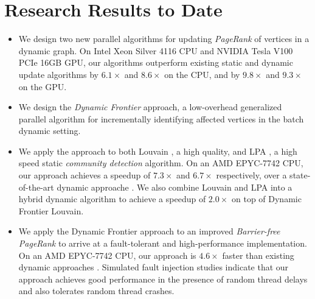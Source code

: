 



\vspace{-2ex}
\section{Research Results to Date}
\vspace{-1ex}

\begin{itemize}[noitemsep, leftmargin=*]
  \item We design two new parallel algorithms for updating \textit{PageRank} of vertices in a dynamic graph. On Intel Xeon Silver 4116 CPU and NVIDIA Tesla V100 PCIe 16GB GPU, our algorithms outperform existing static and dynamic update algorithms by $6.1\times$ and $8.6\times$ on the CPU, and by $9.8\times$ and $9.3\times$ on the GPU.
  \item We design the \textit{Dynamic Frontier} approach, a low-overhead generalized parallel algorithm for incrementally identifying affected vertices in the batch dynamic setting.
  \item We apply the approach to both Louvain \cite{com-blondel08}, a high quality, and LPA \cite{com-raghavan07}, a high speed static \textit{community detection} algorithm. On an AMD EPYC-7742 CPU, our approach achieves a speedup of $7.3\times$ and $6.7\times$ respectively, over a state-of-the-art dynamic approache \cite{com-zarayeneh21}. We also combine Louvain and LPA into a hybrid dynamic algorithm to achieve a speedup of $2.0\times$ on top of Dynamic Frontier Louvain.
  \item We apply the Dynamic Frontier approach to an improved \textit{Barrier-free PageRank} \cite{rank-eedi22} to arrive at a fault-tolerant and high-performance implementation. On an AMD EPYC-7742 CPU, our approach is $4.6\times$ faster than existing dynamic approaches \cite{rank-zhang17, rank-desikan05, rank-giri20}. Simulated fault injection studies indicate that our approach achieves good performance in the presence of random thread delays and also tolerates random thread crashes.
\end{itemize}





